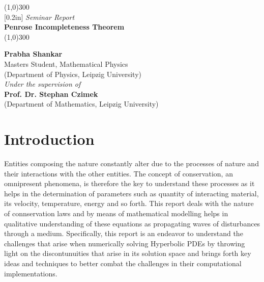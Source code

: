 \documentclass[12pt, a4paper]{report}
\theoremstyle{bfnote}
\begin{document}
\begin{titlepage}
    \begin{center}
    \line(1,0){300}\\
    [0.2in]
    \normalsize{\emph {Seminar Report}}\\	
    \Huge{\bfseries Penrose Incompleteness Theorem}\\
    [-0.12in]
    \line(1,0){300}\\
    
    \vspace{3in}
    
    \LARGE{\bfseries {Prabha Shankar}}\\
    \small{Masters Student, Mathematical Physics}\\
    \small{(Department of Physics, Leipzig University)}\\
    
    \vspace{3cm}
    \normalsize{\emph {Under the supervision of}}\\
    \large{\bfseries {Prof. Dr. Stephan Czimek}}\\
    \small{(Department of Mathematics, Leipzig University)}\\
    
    \end{center}
\end{titlepage}

\section*{Introduction}
Entities composing the nature constantly alter due to the processes of nature
and their interactions with the other entities. The concept of conservation, an
omnipresent phenomena, is therefore the key to understand these processes as it
helps in the determination of parameters such as quantity of interacting
material, its velocity, temperature, energy and so forth. This report deals with
the nature of connservation laws and by means of mathematical modelling helps in
qualitative understanding of these equations as propagating waves of
disturbances through a medium. Specifically, this report is an endeavor to
understand the challenges that arise when numerically solving Hyperbolic PDEs by
throwing light on the discontunuities that arise in its solution space and
brings forth key ideas and techniques to better combat the challenges in their
computational implementations. 
\end{document}
